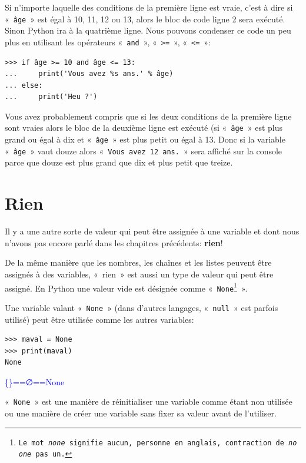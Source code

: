 Si n'importe laquelle des conditions de la première ligne est vraie, c'est à dire si  «~\texttt{âge}~» est égal à 10, 11, 12 ou 13, alors le bloc de code ligne 2 sera exécuté. Sinon Python ira à la quatrième ligne. 
Nous pouvons condenser ce code un peu plus en utilisant les opérateurs «~\texttt{and}~», «~\texttt{>=}~», «~\texttt{<=}~»:

\begin{Verbatim}[frame=single,rulecolor=\color{green}, label=à taper avec attention]
>>> if âge >= 10 and âge <= 13:
...     print('Vous avez %s ans.' % âge)
... else:
...     print('Heu ?')
\end{Verbatim}

Vous avez probablement compris que si les deux conditions de la première ligne sont vraies alors le bloc de la deuxième ligne est exécuté (si «~\texttt{âge}~»  est plus grand ou égal à dix et «~\texttt{âge}~» est plus petit ou égal à 13. Donc si la variable «~\texttt{âge}~» vaut douze alors «~\texttt{Vous avez 12 ans.}~» sera affiché sur la console parce que douze est plus grand que dix et plus petit que treize.

\section{Rien}
Il y a une autre sorte de valeur qui peut être assignée à une variable et dont nous n'avons pas encore parlé dans les chapitres précédents: \textbf{rien}!

De la même manière que les nombres, les chaînes et les listes peuvent être assignés à des variables, «~{rien}~»  est aussi un type de valeur qui peut être assigné. En Python une valeur vide est désignée comme «~\texttt{None\footnote{Le mot \emph{none} signifie aucun, personne en anglais, contraction de \emph{no one} pas un.}}~».

Une variable valant «~\texttt{None}~» (dans d'autres langages, «~\texttt{null}~» est parfois utilisé) peut être utilisée comme les autres variables:

\begin{Verbatim}[frame=single,rulecolor=\color{mbleu}, label=à taper]
>>> maval = None
>>> print(maval)
None
\end{Verbatim}

\begin{center}
\textcolor{blue}{\textrm{\{\}==∅==None}}
\end{center}

«~\texttt{None}~» est une manière de réinitialiser une variable comme étant non utilisée ou une manière de créer une variable sans fixer sa valeur avant de l'utiliser.

